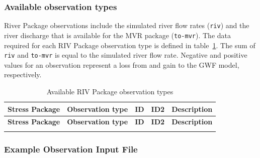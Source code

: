 \vspace{5mm}
\subsubsection{Available observation types}
River Package observations include the simulated river flow rates (\texttt{riv}) and the river discharge that is available for the MVR package (\texttt{to-mvr}). The data required for each RIV Package observation type is defined in table~\ref{table:gwf-rivgobstype}. The sum of \texttt{riv} and \texttt{to-mvr} is equal to the simulated river flow rate. Negative and positive values for an observation represent a loss from and gain to the GWF model, respectively.

\begin{longtable}{p{2cm} p{2.75cm} p{2cm} p{1.25cm} p{7cm}}
\caption{Available RIV Package observation types} \tabularnewline

\hline
\hline
\textbf{Stress Package} & \textbf{Observation type} & \textbf{ID} & \textbf{ID2} & \textbf{Description} \\
\hline
\endfirsthead

\hline
\hline
\textbf{Stress Package} & \textbf{Observation type} & \textbf{ID} & \textbf{ID2} & \textbf{Description} \\
\hline
\endhead

\hline
\endfoot


\label{table:gwf-rivgobstype}
\end{longtable}

\vspace{5mm}
\subsubsection{Example Observation Input File}

